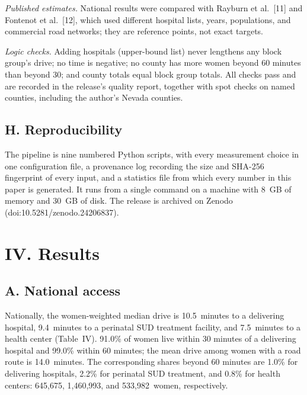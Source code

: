 \documentclass{article}
\begin{document}
\emph{Published estimates.} National results were compared with Rayburn et al.~[11] and Fontenot et al.~[12], which used different hospital lists, years, populations, and commercial road networks; they are reference points, not exact targets.

\emph{Logic checks.} Adding hospitals (upper-bound list) never lengthens any block group's drive; no time is negative; no county has more women beyond 60 minutes than beyond 30; and county totals equal block group totals. All checks pass and are recorded in the release's quality report, together with spot checks on named counties, including the author's Nevada counties.

\subsection*{H. Reproducibility}
The pipeline is nine numbered Python scripts, with every measurement choice in one configuration file, a provenance log recording the size and SHA-256 fingerprint of every input, and a statistics file from which every number in this paper is generated. It runs from a single command on a machine with 8~GB of memory and 30~GB of disk. The release is archived on Zenodo (doi:10.5281/zenodo.24206837).

\section*{IV. Results}

\subsection*{A. National access}
Nationally, the women-weighted median drive is 10.5\ minutes to a delivering hospital, 9.4\ minutes to a perinatal SUD treatment facility, and 7.5\ minutes to a health center (Table~IV). 91.0\% of women live within 30 minutes of a delivering hospital and 99.0\% within 60 minutes; the mean drive among women with a road route is 14.0\ minutes. The corresponding shares beyond 60 minutes are 1.0\% for delivering hospitals, 2.2\% for perinatal SUD treatment, and 0.8\% for health centers: 645,675, 1,460,993, and 533,982\ women, respectively.
\end{document}
